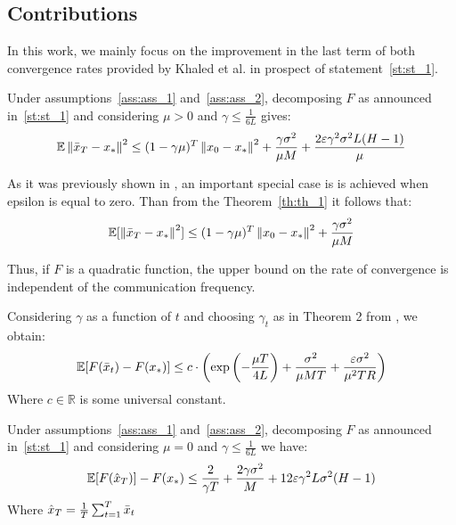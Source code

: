 \subsection{Contributions} \label{subsec:contributions}

In this work, we mainly focus on the improvement in the last term of both convergence rates provided by Khaled et al. in prospect of statement~\ref{st:st_1}.

\begin{theorem} \label{th:th_1}
    Under assumptions~\ref{ass:ass_1} and~\ref{ass:ass_2}, decomposing $F$ as announced in~\ref{st:st_1} and considering $\mu > 0$ and $\gamma \leq \frac{1}{6 L}$ gives:
    \begin{align}
        \E \norm{\bar{x}_T - x_*}^2
        \leq
        (1 - \gamma \mu)^T \norm{x_0 - x_*}^2 
        + \frac{\gamma \sigma^2}{\mu M} 
        + \frac{2 \varepsilon \gamma^2 \sigma^2 L (H-1)}{\mu}
    \end{align}
\end{theorem}

\begin{corollary} \label{}
    As it was previously shown in \cite{Woodworth}, an important special case is is achieved when epsilon is equal to zero. Than from the Theorem~\ref{th:th_1} it follows that:
    \begin{align}
        \E[\norm{\bar{x}_T - x_*}^2]
        \leq
        (1 - \gamma \mu)^T \norm{x_0 - x_*}^2 
        + \frac{\gamma \sigma^2}{\mu M}
    \end{align}
\end{corollary}

Thus, if $F$ is a quadratic function, the upper bound on the rate of convergence is independent of the communication frequency.

\begin{corollary} \label{}
    Considering $\gamma$ as a function of $t$ and choosing $\gamma_t$ as in Theorem 2 from \cite{Woodworth}, we obtain:
    \begin{align}
        \E[F(\bar{x}_t) - F(x_*)]
        \leq
        c \cdot \left(
        \text{exp} \left(-\frac{\mu T}{4 L}\right) +
        \frac{\sigma^2}{\mu MT} + \frac{\varepsilon \sigma^2}{\mu^2 TR}
        \right)
    \end{align}
    Where $c \in \mathbb{R}$ is some universal constant.
\end{corollary}



\begin{theorem} \label{th:th_2}
    Under assumptions~\ref{ass:ass_1} and~\ref{ass:ass_2}, decomposing $F$ as announced in~\ref{st:st_1} and considering $\mu = 0$ and $\gamma \leq \frac{1}{6 L}$ we have:
    \begin{align}
        \E[F(\hat{x}_T)] - F(x_*) \leq
        \frac{2}{\gamma T} + \frac{2 \gamma \sigma^2}{M} + 12 \varepsilon \gamma^2 L \sigma^2 (H-1)
    \end{align}
    Where $\hat{x}_T = \frac{1}{T} \summ{t=1}{T} \bar{x}_t$
\end{theorem}

